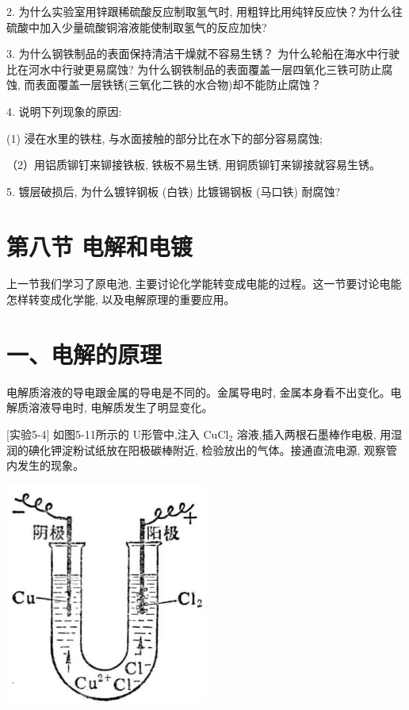 \documentclass[10pt]{article}
\begin{document}
2. 为什么实验室用锌跟稀硫酸反应制取氢气时, 用粗锌比用纯锌反应快？为什么往硫酸中加入少量硫酸铜溶液能使制取氢气的反应加快?

3. 为什么钢铁制品的表面保持清洁干燥就不容易生锈？ 为什么轮船在海水中行驶比在河水中行驶更易腐蚀? 为什么钢铁制品的表面覆盖一层四氧化三铁可防止腐蚀, 而表面覆盖一层铁锈(三氧化二铁的水合物)却不能防止腐蚀？

4. 说明下列现象的原因:

(1) 浸在水里的铁柱, 与水面接触的部分比在水下的部分容易腐蚀;

（2）用铝质铆钉来铆接铁板, 铁板不易生锈, 用铜质铆钉来铆接就容易生锈。

5. 镀层破损后, 为什么镀锌钢板 (白铁) 比镀锡钢板 (马口铁) 耐腐蚀?

\section*{第八节 电解和电镀}

上一节我们学习了原电池, 主要讨论化学能转变成电能的过程。这一节要讨论电能怎样转变成化学能, 以及电解原理的重要应用。

\section*{一、电解的原理}

电解质溶液的导电跟金属的导电是不同的。金属导电时, 金属本身看不出变化。电解质溶液导电时, 电解质发生了明显变化。

[实验5-4] 如图5-11所示的 U形管中,注入 \({\mathrm{{CuCl}}}_{2}\) 溶液,插入两根石墨棒作电极, 用湿润的碘化钾淀粉试纸放在阳极碳棒附近, 检验放出的气体。接通直流电源, 观察管内发生的现象。

\begin{center}
\includegraphics[max width=0.5\textwidth]{images/01912d13-9986-7822-a012-3f3f7be99dcb_167_501923.jpg}
\end{center}
\end{document}
